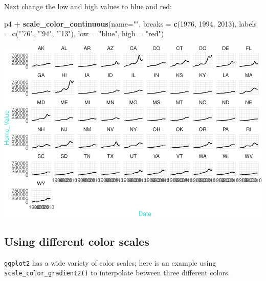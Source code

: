 \documentclass[]{book}
\newenvironment{Shaded}{\begin{snugshade}}{\end{snugshade}}
\newcommand{\DataTypeTok}[1]{\textcolor[rgb]{0.13,0.29,0.53}{#1}}
\newcommand{\DecValTok}[1]{\textcolor[rgb]{0.00,0.00,0.81}{#1}}
\newcommand{\KeywordTok}[1]{\textcolor[rgb]{0.13,0.29,0.53}{\textbf{#1}}}
\newcommand{\NormalTok}[1]{#1}
\newcommand{\OperatorTok}[1]{\textcolor[rgb]{0.81,0.36,0.00}{\textbf{#1}}}
\newcommand{\StringTok}[1]{\textcolor[rgb]{0.31,0.60,0.02}{#1}}
\begin{document}
Next change the low and high values to blue and red:

\begin{Shaded}
\begin{Highlighting}[]
\NormalTok{p4 }\OperatorTok{+}
\StringTok{  }\KeywordTok{scale_color_continuous}\NormalTok{(}\DataTypeTok{name=}\StringTok{""}\NormalTok{,}
                         \DataTypeTok{breaks =} \KeywordTok{c}\NormalTok{(}\DecValTok{1976}\NormalTok{, }\DecValTok{1994}\NormalTok{, }\DecValTok{2013}\NormalTok{),}
                         \DataTypeTok{labels =} \KeywordTok{c}\NormalTok{(}\StringTok{"'76"}\NormalTok{, }\StringTok{"'94"}\NormalTok{, }\StringTok{"'13"}\NormalTok{),}
                         \DataTypeTok{low =} \StringTok{"blue"}\NormalTok{, }\DataTypeTok{high =} \StringTok{"red"}\NormalTok{)}
\end{Highlighting}
\end{Shaded}

\includegraphics{R/Rgraphics/figures/unnamed-chunk-184-1.pdf}

\hypertarget{using-different-color-scales}{%
\subsection{Using different color scales}\label{using-different-color-scales}}

\texttt{ggplot2} has a wide variety of color scales; here is an example using \texttt{scale\_color\_gradient2()} to interpolate between three different colors.
\end{document}
